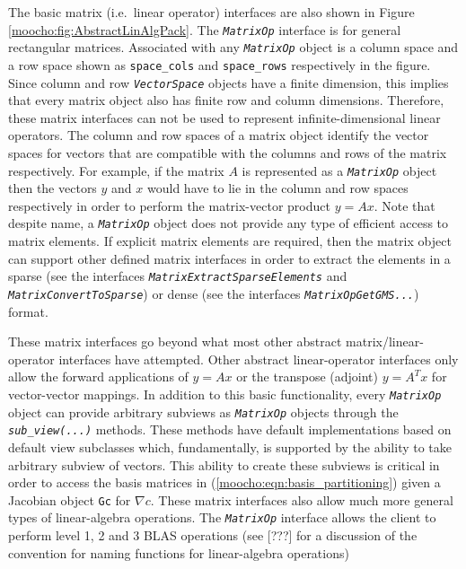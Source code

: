 \documentclass[pdf,12pt,report]{SANDreport}
\begin{document}
The basic matrix (i.e.\ linear operator) interfaces are also shown in Figure
{}\ref{moocho:fig:AbstractLinAlgPack}.  The {}\texttt{\textit{Matrix\-Op}}
interface is for general rectangular matrices.  Associated with any
{}\texttt{\textit{Matrix\-Op}} object is a column space and a row space shown
as {}\texttt{space\_cols} and {}\texttt{space\_rows} respectively in the
figure.  Since column and row {}\texttt{\textit{Vector\-Space}} objects have a
finite dimension, this implies that every matrix object also has finite row
and column dimensions.  Therefore, these matrix interfaces can not be used to
represent infinite-dimensional linear operators.  The column and row spaces of
a matrix object identify the vector spaces for vectors that are compatible
with the columns and rows of the matrix respectively.  For example, if the
matrix $A$ is represented as a {}\texttt{\textit{Matrix\-Op}} object then the
vectors $y$ and $x$ would have to lie in the column and row spaces
respectively in order to perform the matrix-vector product $y = A x$.  Note
that despite name, a {}\texttt{\textit{Matrix\-Op}} object does not provide
any type of efficient access to matrix elements.  If explicit matrix elements
are required, then the matrix object can support other defined matrix
interfaces in order to extract the elements in a sparse (see the interfaces
{}\texttt{\textit{Matrix\-Extract\-Sparse\-Elements}} and
{}\texttt{\textit{Matrix\-Convert\-To\-Sparse}}) or dense (see the interfaces
{}\texttt{\textit{Matrix\-Op\-Get\-GMS...}}) format.

These matrix interfaces go beyond what most other abstract
matrix/linear-operator interfaces have attempted.  Other abstract
linear-operator interfaces only allow the forward applications of $y = A x$ or
the transpose (adjoint) $y = A^T x$ for vector-vector mappings.  In addition
to this basic functionality, every {}\texttt{\textit{Matrix\-Op}} object can
provide arbitrary subviews as {}\texttt{\textit{Matrix\-Op}} objects through
the {}\texttt{\textit{sub\_view(...)}} methods.  These methods have default
implementations based on default view subclasses which, fundamentally, is
supported by the ability to take arbitrary subview of vectors.  This ability
to create these subviews is critical in order to access the basis matrices in
(\ref{moocho:eqn:basis_partitioning}) given a Jacobian object {}\texttt{Gc}
for $\nabla c$.  These matrix interfaces also allow much more general types of
linear-algebra operations.  The {}\texttt{\textit{Matrix\-Op}} interface
allows the client to perform level 1, 2 and 3 BLAS operations (see [???] for a
discussion of the convention for naming functions for linear-algebra
operations)
\end{document}
